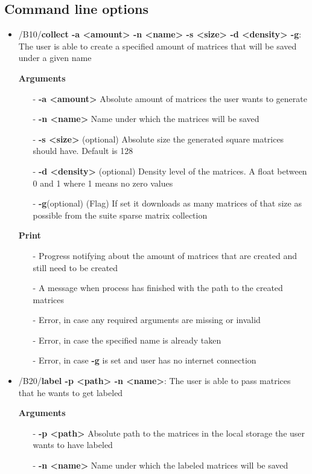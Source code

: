 \documentclass[parskip=full]{scrartcl}
\begin{document}
\subsection{Command line options}
\begin{itemize}
\item/B10/\textbf{collect -a <amount> -n <name> -s <size> -d <density> -g}:
\newline The user is able to create a specified amount of matrices that will be saved under a given name

\textbf{Arguments}
	\begin{itemize}
	\item[-]\textbf{-a <amount>} Absolute amount of matrices the user wants to generate
	\item[-]\textbf{-n <name>} Name under which the matrices will be saved
	\item[-]\textbf{-s <size>} (optional) Absolute size the generated square matrices should have. Default is 128
	\item[-]\textbf{-d <density>} (optional) Density level of the matrices. A float between 0 and 1 where 1 means no zero values
	\item[-]\textbf{-g}(optional) (Flag) If set it downloads as many matrices of that size as possible from the suite sparse matrix collection
	\end{itemize}

\textbf{Print}
	\begin{itemize}
	\item[-]Progress notifying about the amount of matrices that are created and still need to be created
	\item[-]A message when process has finished with the path to the created matrices
	\item[-]Error, in case any required arguments are missing or invalid
	\item[-]Error, in case the specified name is already taken
	\item[-]Error, in case \textbf{-g} is set and user has no internet connection
	\end{itemize}

\item/B20/\textbf{label -p <path> -n <name>}:
\newline The user is able to pass matrices that he wants to get labeled

\textbf{Arguments}
	\begin{itemize}
	\item[-]\textbf{-p <path>} Absolute path to the matrices in the local storage the user wants to have labeled
	\item[-]\textbf{-n <name>} Name under which the labeled matrices will be saved
	\end{itemize}


\end{itemize}
\end{document}
